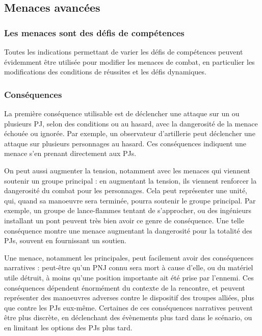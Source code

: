 \documentclass{report}
\begin{document}
\begin{multicols}{2}
\subsection{Menaces avancées}
\subsubsection{Les menaces sont des défis de compétences}
Toutes les indications permettant de varier les défis de compétences peuvent évidemment être utilisée pour modifier les menaces de combat, en particulier les modifications des conditions de réussites et les défis dynamiques.
\subsubsection{Conséquences}
La première conséquence utilisable est de déclencher une attaque sur un ou plusieurs PJ, selon des conditions ou au hasard, avec la dangerosité de la menace échouée ou ignorée. Par exemple, un observateur d'artillerie peut déclencher une attaque sur plusieurs personnages au hasard. Ces conséquences indiquent une menace s'en prenant directement aux PJs.

On peut aussi augmenter la tension, notamment avec les menaces qui viennent soutenir un groupe principal : en augmentant la tension, ils viennent renforcer la dangerosité du combat pour les personnages. Cela peut représenter une unité, qui, quand sa manoeuvre sera terminée, pourra soutenir le groupe principal. Par exemple, un groupe de lance-flammes tentant de s'approcher, ou des ingénieurs installant un pont peuvent très bien avoir ce genre de conséquence. Une telle conséquence montre une menace augmentant la dangerosité pour la totalité des PJs, souvent en fournissant un soutien.

Une menace, notamment les principales, peut facilement avoir des conséquences narratives : peut-être qu'un PNJ connu sera mort à cause d'elle, ou du matériel utile détruit, à moins qu'une position importante ait été prise par l'ennemi. Ces conséquences dépendent énormément du contexte de la rencontre, et peuvent représenter des manoeuvres adverses contre le dispositif des troupes alliées, plus que contre les PJs eux-même. Certaines de ces conséquences narratives peuvent être plus discrète, en déclenchant des évènements plus tard dans le scénario, ou en limitant les options des PJs plus tard.


\end{multicols}
\end{document}
